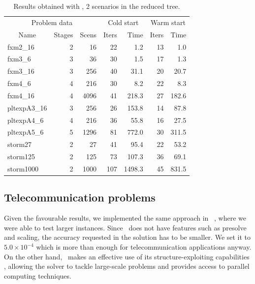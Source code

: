 \begin{table}[ht]
  \begin{center}
    \begin{tabular}{|l|r|r||r|r||r|r|} \hline
      \multicolumn{3}{|c||}{Problem data}&\multicolumn{2}{c||}{Cold start}&\multicolumn{2}{c|}{Warm start}\\
      \multicolumn{1}{|c|}{Name} & Stages & Scens & Iters & Time & Iters & Time \\ \hline \hline
fxm2\_16     &  2 &   16 &  22 &   1.2 & 13 &   1.0 \\
fxm3\_6      &  3 &   36 &  30 &   1.5 & 17 &   1.3 \\
fxm3\_16     &  3 &  256 &  40 &  31.1 & 20 &  20.7 \\
fxm4\_6      &  4 &  216 &  30 &   8.2 & 22 &   8.3 \\
fxm4\_16     &  4 & 4096 &  41 & 218.3 & 27 & 182.6 \\ \hline
pltexpA3\_16 &  3 &  256 &  26 & 153.8 & 14 &  87.8 \\
pltexpA4\_6  &  4 &  216 &  36 &  55.8 & 16 &  27.5 \\
pltexpA5\_6  &  5 & 1296 &  81 & 772.0 & 30 & 311.5 \\ \hline
storm27      &  2 &   27 &  41 &  95.4 & 22 &  53.2 \\
storm125     &  2 &  125 &  73 & 107.3 & 36 &  69.1 \\
storm1000    &  2 & 1000 & 107 &1498.3 & 45 & 831.5 \\ \hline
    \end{tabular}
    \caption{Results obtained with \HOPDM, 2 scenarios in the reduced tree.}
    \label{table:hopdm}
  \end{center} \vspace{-3ex}
\end{table}

%
%
\subsection{Telecommunication problems}

Given the favourable results, we implemented the same approach 
in \OOPS\ \cite{GondzioSarkissian,GondzioGrothey04}, where we were 
able to test larger instances. 
Since \OOPS\ does not have features such as presolve and scaling,
the accuracy requested in the solution has to be smaller. We set it to
$5.0 \times 10^{-4}$ which is more than enough for telecommunication
applications anyway.
On the other hand, \OOPS\ makes an effective use of its structure-exploiting
capabilities \cite{GondzioSarkissian,GondzioGrothey04},
allowing the solver to tackle large-scale problems 
and provides access to parallel computing techniques.

